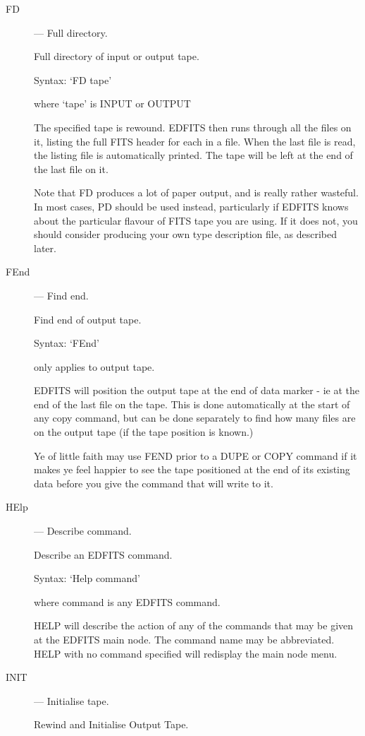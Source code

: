 \begin{description}
\item [FD] --- Full directory.

Full directory of input or output tape.

Syntax:  `FD  tape'      

where `tape' is INPUT or OUTPUT

The specified tape is rewound.  EDFITS then runs through all the
files on it, listing the full FITS header for each in a file.  When
the last file is read, the listing file is automatically printed.
The tape will be left at the end of the last file on it.  

Note that FD produces a lot of paper output, and is really rather
wasteful.  In most cases, PD should be used instead, particularly if
EDFITS knows about the particular flavour of FITS tape you are using.
If it does not, you should consider producing your own type description
file, as described later.

\item [FEnd] --- Find end.

Find end of output tape.

Syntax:   `FEnd'             

only applies to output tape.

EDFITS will position the output tape at the end of data marker - ie
at the end of the last file on the tape.  This is done automatically
at the start of any copy command, but can be done separately to find
how many files are on the output tape (if the tape position is known.)

Ye of little faith may use FEND prior to a DUPE or COPY command if it 
makes ye feel happier to see the tape positioned at the end of its 
existing data before you give the command that will write to it.  

\item [HElp] --- Describe command.

Describe an EDFITS command.

Syntax:  `Help command'  

where command is any EDFITS command.

HELP will describe the action of any of the commands that may be
given at the EDFITS main node.  The command name may be abbreviated.
HELP with no command specified will redisplay the main node menu.

\item [INIT] --- Initialise tape.

Rewind and Initialise Output Tape.


\end{description}
